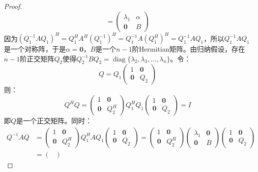 \begin{proof}
\begin{equation*}
		=
		\begin{pmatrix}
			\lambda_1 & \alpha \\
			\mathbf{0} & B
		\end{pmatrix}
	\end{equation*}
	因为$(Q_1^{-1}AQ_1)^H=Q_1^HA^H(Q_1^{-1})^H=Q_1^{-1}A(Q_1^H)^H=Q_1^{-1}AQ_1$，所以$Q_1^{-1}AQ_1$是一个对称阵，于是$\alpha=\mathbf{0}$，$B$是一个$n-1$阶Hermitian矩阵。由归纳假设，存在$n-1$阶正交矩阵$Q_2$使得$Q_2^{-1}BQ_2=\operatorname{diag}\{\lambda_2,\lambda_3,\dots,\lambda_n\}$。令：
	\begin{equation*}
		Q=Q_1
		\begin{pmatrix}
			1 & \mathbf{0} \\
			\mathbf{0} & Q_2
		\end{pmatrix}
	\end{equation*}
	则：
	\begin{equation*}
		Q^HQ=
		\begin{pmatrix}
			1 & \mathbf{0} \\
			\mathbf{0} & Q_2^H
		\end{pmatrix}
		Q_1^HQ_1
		\begin{pmatrix}
			1 & \mathbf{0} \\
			\mathbf{0} & Q_2
		\end{pmatrix}
		=I
	\end{equation*}
	即$Q$是一个正交矩阵。同时：
	\begin{align*}
		Q^{-1}AQ
		&=
		\begin{pmatrix}
			1 & \mathbf{0} \\
			\mathbf{0} & Q_2^H
		\end{pmatrix}
		Q_1^HAQ_1
		\begin{pmatrix}
			1 & \mathbf{0} \\
			\mathbf{0} & Q_2
		\end{pmatrix}
		=
		\begin{pmatrix}
			1 & \mathbf{0} \\
			\mathbf{0} & Q_2^H
		\end{pmatrix}
		\begin{pmatrix}
			\lambda_1 & \mathbf{0} \\
			\mathbf{0} & B
		\end{pmatrix}
		\begin{pmatrix}
			1 & \mathbf{0} \\
			\mathbf{0} & Q_2
		\end{pmatrix} \\
		&=
		\begin{pmatrix}

\end{pmatrix}
\end{align*}
\end{proof}
